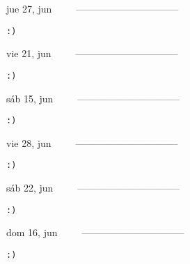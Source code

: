 \documentclass[letterpaper,10pt]{article}
\begin{document}
\begin{multicols}{3}
{jue 27, jun\ \ \ \ \ --------------------------------}
\begin{flushright}\begin{small}\texttt{:)}\end{small}\end{flushright}
\vfill
{vie 21, jun\ \ \ \ \ --------------------------------}
\begin{flushright}\begin{small}\texttt{:)}\end{small}\end{flushright}\par
\vfill
{sáb 15, jun\ \ \ \ \ --------------------------------}
\begin{flushright}\begin{small}\texttt{:)}\end{small}\end{flushright}\par
\vfill
\end{multicols}
\vspace{1.05cm}

\begin{multicols}{3}
{vie 28, jun\ \ \ \ \ --------------------------------}
\begin{flushright}\begin{small}\texttt{:)}\end{small}\end{flushright}
\vfill
{sáb 22, jun\ \ \ \ \ --------------------------------}
\begin{flushright}\begin{small}\texttt{:)}\end{small}\end{flushright}\par
\vfill
{dom 16, jun\ \ \ \ \ --------------------------------}
\begin{flushright}\begin{small}\texttt{:)}\end{small}\end{flushright}\par
\vfill
\end{multicols}
\vspace{1.05cm}
\end{document}
